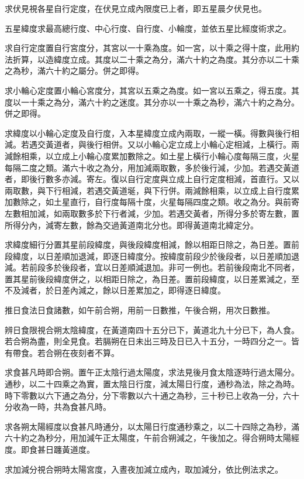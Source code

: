 求伏見視各星自行定度，在伏見立成內限度已上者，即五星晨夕伏見也。

五星緯度求最高總行度、中心行度、自行度、小輪度，並依五星比經度術求之。

求自行定度置自行宮度分，其宮以一十乘為度。如一宮，以十乘之得十度，此用約法折算，以造緯度立成。其度以二十乘之為分，滿六十約之為度。其分亦以二十乘之為秒，滿六十約之屬分。併之即得。

求小輪心定度置小輪心宮度分，其宮以五乘之為度。如一宮以五乘之，得五度。其度以一十乘之為分，滿六十約之迷度。其分亦以一十乘之為秒，滿六十約之為分。併之即得。

求緯度以小輪心定度及自行度，入本星緯度立成內兩取，一縱一橫。得數與後行相減。若遇交黃道者，與後行相併。又以小輪心定立成上小輪心定相減，上橫行。兩減餘相乘，以立成上小輪心度累加數除之。如土星上橫行小輪心度每隔三度，火星每隔二度之類。滿六十收之為分，用加減兩取數，多於後行減，少加。若遇交黃道者，即後行數多亦減。寄左。復以自行定度與立成上自行定度相減，首直行。又以兩取數，與下行相減，若遇交黃道埏，與下行併。兩減餘相乘，以立成上自行度累加數除之，如土星直行，自行度每隔十度，火星每隔四度之類。收之為分。與前寄左數相加減，如兩取數多於下行者減，少加。若遇交黃者，所得分多於寄左數，置所得分內，減寄左數，餘為交過黃道南北分也。即得黃道南北緯定分。

求緯度細行分置其星前段緯度，與後段緯度相減，餘以相距日除之，為日差。置前段緯度，以日差順加退減，即逐日緯度分。按緯度前段少於後段者，以日差順加退減。若前段多於後段者，宜以日差順減退加。非可一例也。若前後段南北不同者，置其星前後段緯度併之，以相距日除之，為日差。置前段緯度，以日差累減之，至不及減者，於日差內減之，餘以日差累加之，即得逐日緯度。

推日食法日食諸數，如午前合朔，用前一日數推，午後合朔，用次日數推。

辨日食限視合朔太陰緯度，在黃道南四十五分已下，黃道北九十分已下，為人食。若合朔為盡，則全見食。若膈朔在日未出三時及日已入十五分，一時四分之一。皆有帶食。若合朔在夜刻者不算。

求食甚凡時即合朔。置午正太陰行過太陽度，求法見後月食太陰逐時行過太陽分。通秒，以二十四乘之為實，置太陰日行度，減太陽日行度，通秒為法，除之為時。時下零數以六下通之為分，分下零數以六十通之為秒，三十秒已上收為一分，六十分收為一時，共為食甚凡時。

求各朔太陽經度以食甚凡時通分，以太陽日行度通秒乘之，以二十四除之為秒，滿六十約之為秒分，用加減午正太陽度，午前合朔減之，午後加之。得合朔時太陽經度。即食甚日躔黃道度。

求加減分視合朔時太陽宮度，入晝夜加減立成內，取加減分，依比例法求之。

